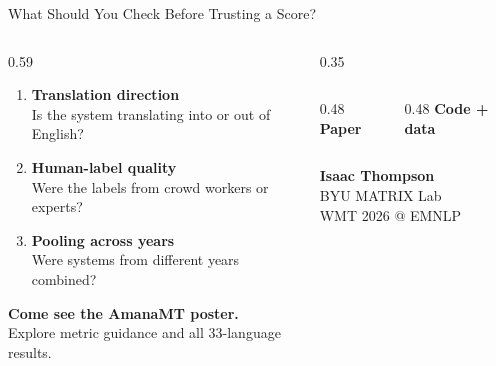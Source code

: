 \documentclass[aspectratio=169,11pt]{beamer}
\begin{document}
\begin{frame}{What Should You Check Before Trusting a Score?}
\begin{columns}[c,totalwidth=\textwidth]
\begin{column}{0.59\textwidth}
  \begin{enumerate}
    \setlength\itemsep{0.7em}
    \item \textbf{Translation direction}\\[-0.15em]
          Is the system translating into or out of English?
    \item \textbf{Human-label quality}\\[-0.15em]
          Were the labels from crowd workers or experts?
    \item \textbf{Pooling across years}\\[-0.15em]
          Were systems from different years combined?
  \end{enumerate}

  \vspace{0.6em}
  {\Large\bfseries\color{byuRoyal}Come see the AmanaMT poster.}\\[0.25em]
  {\large Explore metric guidance and all 33-language results.}
\end{column}
\begin{column}{0.35\textwidth}
  \centering
  \begin{columns}[T,totalwidth=\linewidth]
    \begin{column}{0.48\linewidth}
      \centering\vspace{0pt}
      \textbf{Paper}\\[0.35em]
    \end{column}
    \begin{column}{0.48\linewidth}
      \centering\vspace{0pt}
      \textbf{Code + data}\\[0.35em]
    \end{column}
  \end{columns}

  \vspace{0.8em}
  {\large\bfseries Isaac Thompson}\\
  BYU MATRIX Lab\\
  WMT 2026 @ EMNLP
\end{column}
\end{columns}
\end{frame}
\end{document}
